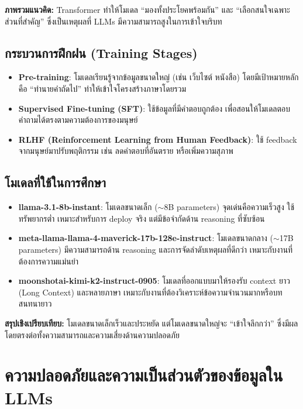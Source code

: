 \textbf{ภาพรวมแนวคิด:} Transformer ทำให้โมเดล ``มองทั้งประโยคพร้อมกัน''
และ ``เลือกสนใจเฉพาะส่วนที่สำคัญ'' ซึ่งเป็นเหตุผลที่ LLMs มีความสามารถสูงในการเข้าใจบริบท

\subsection{กระบวนการฝึกฝน (Training Stages)}

\begin{itemize}
  \item \textbf{Pre-training}: โมเดลเรียนรู้จากข้อมูลขนาดใหญ่ (เช่น เว็บไซต์ หนังสือ)
    โดยมีเป้าหมายหลักคือ ``ทำนายคำถัดไป'' ทำให้เข้าใจโครงสร้างภาษาโดยรวม
  \item \textbf{Supervised Fine-tuning (SFT)}: ใช้ข้อมูลที่มีคำตอบถูกต้อง
    เพื่อสอนให้โมเดลตอบคำถามได้ตรงตามความต้องการของมนุษย์
  \item \textbf{RLHF (Reinforcement Learning from Human Feedback)}:
    ใช้ feedback จากมนุษย์มาปรับพฤติกรรม เช่น ลดคำตอบที่อันตราย หรือเพิ่มความสุภาพ
\end{itemize}

\subsection{โมเดลที่ใช้ในการศึกษา}

\begin{itemize}\sloppy
  \item \textbf{llama-3.1-8b-instant}: โมเดลขนาดเล็ก ($\sim$8B parameters)
    จุดเด่นคือความเร็วสูง ใช้ทรัพยากรต่ำ เหมาะสำหรับการ deploy จริง
    แต่มีข้อจำกัดด้าน reasoning ที่ซับซ้อน
  \item \textbf{meta-llama-llama-4-maverick-17b-128e-instruct}: โมเดลขนาดกลาง ($\sim$17B parameters)
    มีความสามารถด้าน reasoning และการจัดลำดับเหตุผลที่ดีกว่า เหมาะกับงานที่ต้องการความแม่นยำ
  \item \textbf{moonshotai-kimi-k2-instruct-0905}: โมเดลที่ออกแบบมาให้รองรับ context ยาว (Long Context)
    และหลายภาษา เหมาะกับงานที่ต้องวิเคราะห์ข้อความจำนวนมากหรือบทสนทนายาว
\end{itemize}

\textbf{สรุปเชิงเปรียบเทียบ:} โมเดลขนาดเล็กเร็วและประหยัด แต่โมเดลขนาดใหญ่จะ ``เข้าใจลึกกว่า''
ซึ่งมีผลโดยตรงต่อทั้งความสามารถและความเสี่ยงด้านความปลอดภัย

\section{ความปลอดภัยและความเป็นส่วนตัวของข้อมูลใน LLMs}

